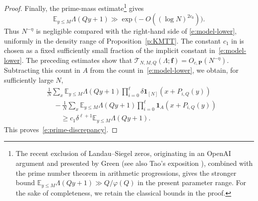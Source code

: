 \documentclass[12pt]{amsart}
\newcommand{\E}{\mathbb E}
\newcommand{\1}{\mathbf 1}
\begin{document}
\begin{proof}
Finally, the prime-mass estimate\footnote{The recent exclusion of Landau--Siegel zeros,
originating in an OpenAI argument and presented by Green
\cite{GreenNoSiegel} (see also Tao's exposition
\cite{TaoNoSiegel}), combined with the prime number theorem
in arithmetic progressions, gives the stronger bound
$\E_{y\leq M}\Lambda(Qy+1)\gg Q/\varphi(Q)$
in the present parameter range. For the sake of completeness,
we retain the classical bounds in the proof.} \cite[(5.15)]{KMTT} gives
\begin{equation}\label{e:prime-mass}
 \E_{y\leq M}\Lambda(Qy+1)
 \gg\exp\bigl(-O((\log N)^{2c_0})\bigr).
\end{equation}
Thus $N^{-\eta}$ is negligible compared with the right-hand side of
\eqref{e:model-lower}, uniformly in the density range of
Proposition~\ref{p:KMTT}. The constant $c_1$ in
\cite[(5.11)]{KMTT} is chosen as a fixed sufficiently small fraction of
the implicit constant in~\eqref{e:model-lower}. The preceding estimates show that
$\mathcal T_{N,M,Q}(\Lambda;\mathbf f)
=O_{c,\mathbf P}(N^{-\eta})$.
Subtracting this count in $A$ from the  count
in~\eqref{e:model-lower}, we obtain, for sufficiently large $N$,
\begin{align*}
 &\frac1N\sum_x\E_{y\leq M}\Lambda(Qy+1)
 \prod_{i=0}^{\ell}\delta\1_{[N]}(x+P_{i,Q}(y))\\
 &\quad-\frac1N\sum_x\E_{y\leq M}\Lambda(Qy+1)
 \prod_{i=0}^{\ell}\1_A(x+P_{i,Q}(y))\\
 &\qquad\geq
 c_1\delta^{\ell+1}\E_{y\leq M}\Lambda(Qy+1).
\end{align*}
This proves~\eqref{e:prime-discrepancy}.
\end{proof}
\end{document}
